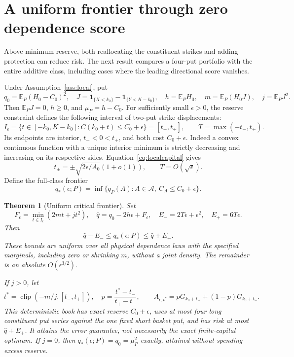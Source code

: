 \documentclass[11pt,a4paper]{amsart}
\theoremstyle{plain}
\newtheorem{theorem}{Theorem}[section]
\theoremstyle{definition}
\theoremstyle{remark}
\newcommand{\EE}{\mathbb{E}}
\DeclareMathOperator{\clip}{clip}
\newcommand{\one}{\mathbf{1}}
\newcommand{\calA}{\mathcal{A}}
\begin{document}
\section{A uniform frontier through zero dependence score}\label{sec:general}

Above minimum reserve, both reallocating the constituent strikes and adding protection can reduce risk. The next result compares a four-put portfolio with the entire additive class, including cases where the leading directional score vanishes.

Under Assumption~\ref{ass:local}, put
\begin{equation}\label{eq:scores}
 q_0=\EE_P(H_0-C_0)^2,\quad
 J=\one_{\{X<k_0\}}-\one_{\{Y<K-k_0\}},\quad
 h=\EE_PH_0,\quad m=\EE_P(H_0J),\quad j=\EE_PJ^2.
\end{equation}
Then $\EE_PJ=0$, $h\ge0$, and $\mu_P=h-C_0$. For sufficiently small $\epsilon>0$, the reserve constraint defines the following interval of two-put strike displacements:
\begin{equation}\label{eq:actualinterval}
 I_\epsilon=\{t\in[-k_0,K-k_0]:C(k_0+t)\le C_0+\epsilon\}
 =[t_-,t_+],\qquad T=\max(-t_-,t_+).
\end{equation}
Its endpoints are interior, $t_-<0<t_+$, and both cost $C_0+\epsilon$. Indeed a convex continuous function with a unique interior minimum is strictly decreasing and increasing on its respective sides. Equation~\eqref{eq:localcapital} gives
\begin{equation}\label{eq:endpointscale}
 t_\pm=\pm\sqrt{2\epsilon/A_0}(1+o(1)),\qquad T=O(\sqrt\epsilon).
\end{equation}
Define the full-class frontier
\[
 q_*(\epsilon;P)=\inf\{q_P(A):A\in\calA,\ C_A\le C_0+\epsilon\}.
\]

\begin{theorem}[Uniform critical frontier]\label{thm:uniform}
Set
\[
 F_\epsilon=\min_{t\in I_\epsilon}(2mt+jt^2),\quad
 \widehat q=q_0-2h\epsilon+F_\epsilon,\quad
 E_-=2T\epsilon+\epsilon^2,\quad E_+=6T\epsilon.
\]
Then
\begin{equation}\label{eq:uniformbounds}
 \widehat q-E_-\le q_*(\epsilon;P)\le\widehat q+E_+.
\end{equation}
These bounds are uniform over all physical dependence laws with the specified marginals, including zero or shrinking $m$, without a joint density. The remainder is an absolute $O(\epsilon^{3/2})$.

If $j>0$, let
\begin{equation}\label{eq:endpointmix}
 t^*=\clip(-m/j,[t_-,t_+]),\quad
 p=\frac{t^*-t_-}{t_+-t_-},\qquad
 A_{\epsilon,t^*}=pG_{k_0+t_+}+(1-p)G_{k_0+t_-}.
\end{equation}
This deterministic book has exact reserve $C_0+\epsilon$, uses at most four long constituent put series against the one fixed short basket put, and has risk at most $\widehat q+E_+$. It attains the error guarantee, not necessarily the exact finite-capital optimum. If $j=0$, then $q_*(\epsilon;P)=q_0=\mu_P^2$ exactly, attained without spending excess reserve.
\end{theorem}
\end{document}
